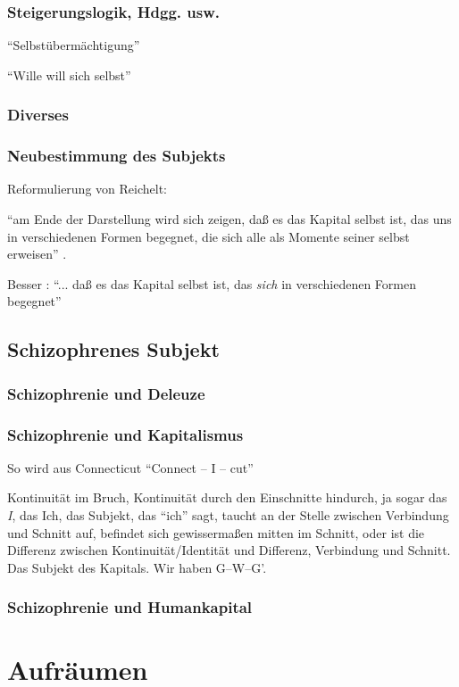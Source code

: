 \documentclass[12pt,
               DIV13,
               paper=a4,
               twoside=false,
               onehalfspacing,
               bibliography=totoc,
               toc=graduated,
               draft,
               ]{scrartcl}
\newcommand{\pc}[2]{\parencite[#1]{#2}}
\newcommand{\worries}[1]{\ifdraft{\textcolor{blue}{\texttt{(#1)}}}{}}
\newcommand{\gwg}{G--W--G'\xspace}
\begin{document}
\subsubsection{Steigerungslogik, Hdgg. usw.}

"`Selbstübermächtigung"'

"`Wille will sich selbst"'

\subsubsection{Diverses}

\subsubsection{Neubestimmung des Subjekts}

Reformulierung von Reichelt:

"`am Ende der Darstellung wird sich zeigen, daß es das Kapital selbst
ist, das uns in verschiedenen Formen begegnet, die sich alle als
Momente seiner selbst erweisen"' \pc{181}{reichelt}.

Besser \worries{?}: "`... daß es das Kapital selbst ist, das
\emph{sich} in verschiedenen Formen begegnet"'

\subsection{Schizophrenes Subjekt}

\subsubsection{Schizophrenie und Deleuze}

\subsubsection{Schizophrenie und Kapitalismus}

So wird aus Connecticut "`Connect -- I -- cut"' \pc{48}{ao}

Kontinuität im Bruch, Kontinuität durch den Einschnitte hindurch, ja
sogar das \emph{I}, das Ich, das Subjekt, das "`ich"' sagt, taucht an
der Stelle zwischen Verbindung und Schnitt auf, befindet sich
gewissermaßen mitten im Schnitt, oder ist die Differenz zwischen
Kontinuität/Identität und Differenz, Verbindung und Schnitt. Das
Subjekt des Kapitals. Wir haben \gwg.

\subsubsection{Schizophrenie und Humankapital}

\section{Aufräumen}

\newpage
\nocite{*}
\printshorthands
\printbibliography
\end{document}
